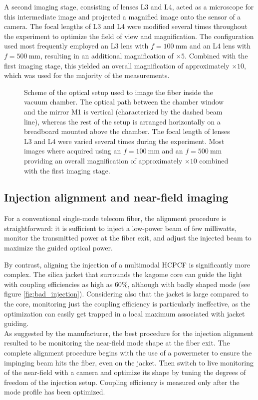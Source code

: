 A second imaging stage, consisting of lenses L3 and L4, acted as a microscope for this intermediate image and projected a magnified image onto the sensor of a camera. The focal lengths of L3 and L4 were modified several times throughout the experiment to optimize the field of view and magnification. The configuration used most frequently employed an L3 lens with $f=100~\mathrm{mm}$ and an L4 lens with $f=500~\mathrm{mm}$, resulting in an additional magnification of $\times5$. Combined with the first imaging stage, this yielded an overall magnification of approximately $\times10$, which was used for the majority of the measurements.

\begin{figure}[!h]
    \centering
    
    \caption{Scheme of the optical setup used to image the fiber inside the vacuum chamber. The optical path between the chamber window and the mirror M1 is vertical (characterized by the dashed beam line), whereas the rest of the setup is arranged horizontally on a breadboard mounted above the chamber. The focal length of lenses L3 and L4 were varied several times during the experiment. Most images where acquired using an $f=100~\mathrm{mm}$ and an $f=500~\mathrm{mm}$ providing an overall magnification of approximately $\times 10$ combined with the first imaging stage.}
    \label{fig:upper_breadboard_imaging_setup}
\end{figure}


\subsection{Injection alignment and near-field imaging}\label{sec:injection_alignment_nf_imaging}
For a conventional single-mode telecom fiber, the alignment procedure is straightforward: it is sufficient to inject a low-power beam of few milliwatts, monitor the transmitted power at the fiber exit, and adjust the injected beam to maximize the guided optical power.

By contrast, aligning the injection of a multimodal HCPCF is significantly more complex. The silica jacket that surrounds the kagome core can guide the light with coupling efficiencies as high as $60\%$, although with badly shaped mode (see figure \ref{fig:bad_injection}). Considering also that the jacket is large compared to the core, monitoring just the coupling efficiency is particularly ineffective, as the optimization can easily get trapped in a local maximum associated with jacket guiding.\\
As suggested by the manufacturer, the best procedure for the injection alignment resulted to be monitoring the near-field mode shape at the fiber exit. The complete alignment procedure begins with the use of a powermeter to ensure the impinging beam hits the fiber, even on the jacket. Then switch to live monitoring of the near-field with a camera and optimize its shape by tuning the degrees of freedom of the injection setup. Coupling efficiency is measured only after the mode profile has been optimized.

